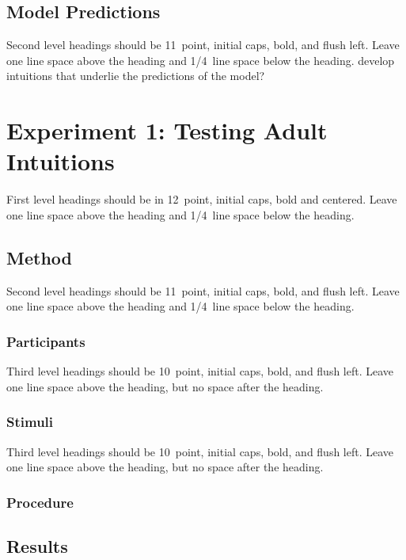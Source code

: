 \documentclass[10pt,letterpaper]{article}
\begin{document}
\subsection{Model Predictions}

Second level headings should be 11~point, initial caps, bold, and
flush left. Leave one line space above the heading and 1/4~line
space below the heading.
develop intuitions that underlie the predictions of the model?


\section{Experiment 1: Testing Adult Intuitions}

First level headings should be in 12~point, initial caps, bold and
centered. Leave one line space above the heading and 1/4~line space
below the heading.

\subsection{Method}

Second level headings should be 11~point, initial caps, bold, and
flush left. Leave one line space above the heading and 1/4~line
space below the heading.


\subsubsection{Participants}

Third level headings should be 10~point, initial caps, bold, and flush
left. Leave one line space above the heading, but no space after the
heading.

\subsubsection{Stimuli}

Third level headings should be 10~point, initial caps, bold, and flush
left. Leave one line space above the heading, but no space after the
heading.

\subsubsection{Procedure}

\subsection{Results}
\end{document}
